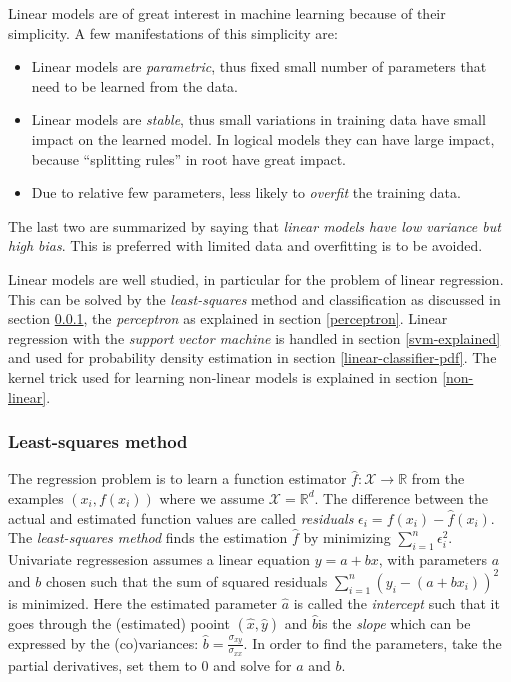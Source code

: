 Linear models are of great interest in machine learning because of their simplicity.
A few manifestations of this simplicity are:
\begin{itemize}
  \item Linear models are \emph{parametric}, thus fixed small number of parameters that need to be learned from the data.
  \item Linear models are \emph{stable}, thus small variations in training data have small impact on the learned model. In logical models they can have large impact, because ``splitting rules'' in root have great impact.
  \item Due to relative few parameters, less likely to \emph{overfit} the training data.
\end{itemize}

The last two are summarized by saying that \emph{linear models have low variance but high bias}.
This is preferred with limited data and overfitting is to be avoided.

Linear models are well studied, in particular for the problem of linear regression.
This can be solved by the \emph{least-squares} method and classification as discussed in section \ref{least-squares}, the \emph{perceptron} as explained in section \ref{perceptron}.
Linear regression with the \emph{support vector machine} is handled in section \ref{svm-explained} and used for probability density estimation in section \ref{linear-classifier-pdf}.
The kernel trick used for learning non-linear models is explained in section \ref{non-linear}.


\subsubsection{Least-squares method}\label{least-squares}
The regression problem is to learn a function estimator $\hat{f}:\mathcal{X} \to \mathbb{R}$ from the examples $(x_i, f(x_i))$ where we assume $\mathcal{X} = \mathbb{R}^d$.
The difference between the actual and estimated function values are called \emph{residuals} $\epsilon_i = f(x_i) - \hat{f}(x_i)$.
The \emph{least-squares method} finds the estimation $\hat{f}$ by minimizing $\sum_{i=1}^{n} \epsilon_i^2$.
Univariate regressesion assumes a linear equation $y = a + b x$, with parameters $a$ and $b$ chosen such that the sum of squared residuals $\sum_{i=1}^{n} (y_i - (a + b x_i))^2$ is minimized.
Here the estimated parameter $\hat{a}$ is called the \emph{intercept} such that it goes through the (estimated) pooint $(\hat{x},\hat{y})$ and $\hat{b}$is the \emph{slope} which can be expressed by the (co)variances: $\hat{b} = \frac{\sigma_{xy}}{\sigma_{xx}}$.
In order to find the parameters, take the partial derivatives, set them to $0$ and solve for $a$ and $b$.

